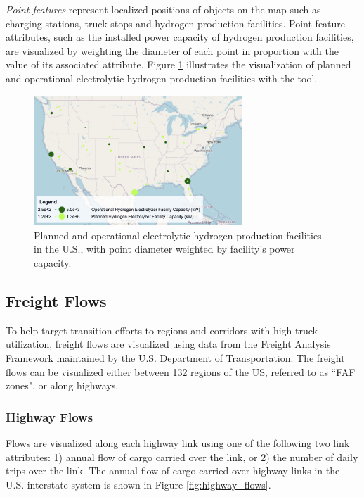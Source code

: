 \textit{Point features} represent localized positions of objects on the map such as charging stations, truck stops and hydrogen production facilities. Point feature attributes, such as the installed power capacity of hydrogen production facilities, are visualized by weighting the diameter of each point in proportion with the value of its associated attribute. Figure \ref{fig:electrolyzer_facilities} illustrates the visualization of planned and operational electrolytic hydrogen production facilities with the tool. 

\begin{figure}[ht]
        \centering
        \includegraphics[width=0.7\textwidth]{figures/electrolyzer_facilities.png}
        \caption{Planned and operational electrolytic hydrogen production facilities in the U.S., with point diameter weighted by facility's power capacity.}
        \label{fig:electrolyzer_facilities}
\end{figure}

\subsection{Freight Flows}

To help target transition efforts to regions and corridors with high truck utilization, freight flows are visualized using data from the Freight Analysis Framework \cite{faf5_2024} maintained by the U.S. Department of Transportation. The freight flows can be visualized either between 132 regions of the US, referred to as ``FAF zones", or along highways. 

\subsubsection{Highway Flows}
Flows are visualized along each highway link using one of the following two link attributes: 1) annual flow of cargo carried over the link, or 2) the number of daily trips over the link. The annual flow of cargo carried over highway links in the U.S. interstate system is shown in Figure \ref{fig:highway_flows}.

